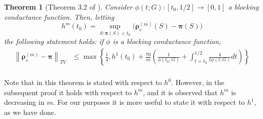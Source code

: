 \documentclass{article}
\newcommand{\norm}[1]{\left\lVert#1\right\rVert}
\newcommand{\1}{\mathbf{1}}
\newcommand{\pibf}{\bm{\pi}}
\newcommand{\rhobf}{\bm{\rho}}
\theoremstyle{aldenthm}
\newtheorem{theorem}{Theorem}
\begin{document}
\begin{theorem}[Theorem 3.2 of \cite{montenegro2002}]
	\label{thm: montenegro}
	Consider $\phi(t; G): [t_0, 1/2] \to [0,1]$ a blocking conductance function. Then, letting
	\begin{equation*}
	h^m(t_0) = \sup_{S: \pibf(S) < t_0}  \bigl(\rhobf_v^{(m)}(S) - \pibf(S) \bigr)
	\end{equation*}
	the following statement holds: if $\phi$ is a blocking conductance function,
	\begin{align*}
	\norm{\rhobf_v^{(m)} - \pibf}_{TV} & \leq \max\left\{ \frac{1}{4}, h^1(t_0) +  \frac{70}{m}\left(\frac{1}{\phi(t_0; G)} + \int_{t = t_0}^{1/2} \frac{4}{t \phi(t; G)} dt\right) \right\} \\
	\end{align*}
\end{theorem}

Note that in \cite{montenegro2002} this theorem is stated with respect to $h^0$. However, in the subsequent proof it holds with respect to $h^m$, and it is observed that $h^m$ is decreasing in $m$. For our purposes it is more useful to state it with respect to $h^1$, as we have done.
\end{document}
